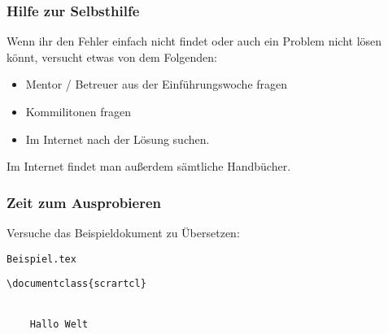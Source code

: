 \begin{frame}
    \frametitle{Hilfe zur Selbsthilfe}
    Wenn ihr den Fehler einfach nicht findet oder auch ein Problem nicht lösen könnt, versucht etwas von dem Folgenden:
    \begin{itemize}
        \item Mentor / Betreuer aus der Einführungswoche fragen
        \item Kommilitonen fragen
        \item Im Internet nach der Lösung suchen.
    \end{itemize}
    
    \bigskip
    Im Internet findet man außerdem sämtliche Handbücher.
\end{frame}

\begin{frame}[fragile]
    \frametitle{Zeit zum Ausprobieren}
    Versuche das Beispieldokument zu Übersetzen:
    \begin{block}{\texttt{Beispiel.tex}}
    \begin{verbatim}
\documentclass{scrartcl}


    Hallo Welt

\end{verbatim}
    \end{block}
\end{frame}